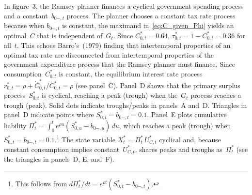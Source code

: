 \documentclass[12pt]{article}
\newcommand{\TS}[1]{{\textcolor{magenta}{#1}}}
\begin{document}
{In figure~3, the Ramsey planner finances a cyclical government spending process and a constant~$b_{0-,t}$ process. The planner chooses a constant tax rate process {because when $b_{0-,t}$ is constant, the maximand in~\eqref{eq:C_given_Phi} yields an optimal~$C$ that is independent of~$G_t$. Since $C_{0,t}^* = 0.64$, $\tau_{0,t}^* = 1-C_{0,t}^* = 0.36$ for all~$t$. This echoes Barro's~(1979) finding that  intertemporal properties of an optimal tax rate are disconnected from intertemporal properties of the government expenditure process that the Ramsey planner must finance.}
Since   consumption~$C_{0,t}^*$ is constant, the equilibrium interest rate process $r_{0,t}^* = \rho + \dot{C}_{0,t}^*/C_{0,t}^* = \rho$ (see panel~C). Panel~D shows that the primary surplus process~$S_{0,t}^*$ is cyclical, reaching a peak (trough) when the~$G_t$ process reaches a trough (peak). Solid dots indicate troughs/peaks in panels~A and~D. Triangles in panel~D indicate points where $S_{0,t}^* = b_{0-,t} = 0.1$.
Panel~E plots  cumulative liability $\Pi_t^* = \int_0^t e^{\rho u}(S_{0,u}^*-b_{0-,u})\, du$, which reaches a peak (trough) when $S_{0,t}^* = b_{0-,t} = 0.1$.\footnote{This follows from $d\Pi_t^*/dt = e^{\rho t}(S_{0,t}^*-b_{0-,t})$.} The state variable $X_t^* = \Pi_t^*\, U_{C,t}^*$ cyclical and, because constant consumption implies constant~$U_{C,t}^*$,  shares peaks and troughs as~$\Pi_t^*$  (see the triangles in panels~D, E, and~F).

%
%
%

}
\end{document}
